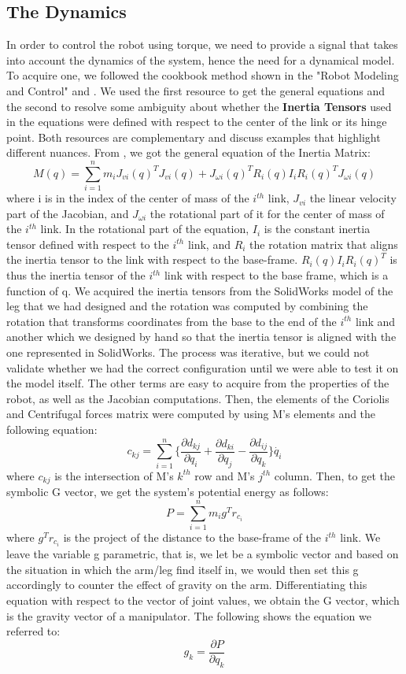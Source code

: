 \subsection{The Dynamics} \label{sec:Dynamics}
In order to control the robot using torque, we need to provide a signal that takes into account the dynamics of the system, hence the need for a dynamical model. To acquire one, we followed the cookbook method shown in the "Robot Modeling and Control" \cite{spong2006robot} and \cite{murray2017mathematical}. We used the first resource to get the general equations and the second to resolve some ambiguity about whether the \textbf{Inertia Tensors} used in the equations were defined with respect to the center of the link or its hinge point. Both resources are complementary and discuss examples that highlight different nuances.
From \cite{spong2006robot}, we got the general equation of the Inertia Matrix:
$$
    M(q) = \sum_{i=1}^n m_i J_{vi}(q)^T J_{vi}(q) +J_{\omega i}(q)^T R_i(q) I_i R_i(q)^T J_{\omega i}(q)
$$
where i is in the index of the center of mass of the $i^{th}$ link, $J_{vi}$ the linear velocity part of the Jacobian, and  $J_{\omega i}$ the rotational part of it for the center of mass of the $i^{th}$ link. In the rotational part of the equation, $I_i$ is the constant inertia tensor defined with respect to the $i^{th}$ link, and $R_i$ the rotation matrix that aligns the inertia tensor to the link with respect to the base-frame. $R_i(q) I_i R_i(q)^T$ is thus the inertia tensor of the $i^{th}$ link with respect to the base frame, which is a function of q.
We acquired the inertia tensors from the SolidWorks model of the leg that we had designed and the rotation was computed by combining the rotation that transforms coordinates from the base to the end of the $i^{th}$ link and another which we designed by hand so that the inertia tensor is aligned with the one represented in SolidWorks. The process was iterative, but we could not validate whether we had the correct configuration until we were able to test it on the model itself.
The other terms are easy to acquire from the properties of the robot, as well as the Jacobian computations.
Then, the elements of the Coriolis and Centrifugal forces matrix were computed by using M's elements and the following equation:
$$
    c_{kj} = \sum_{i=1}^n \{\frac{\partial d_{kj}}{\partial q_i} + \frac{\partial d_{ki}}{\partial q_j} - \frac{\partial d_{ij}}{\partial q_k} \}\dot{q_i}
$$
where $c_{kj}$ is the intersection of M's $k^{th}$ row and M's $j^{th}$ column.
Then, to get the symbolic G vector, we get the system's potential energy as follows:
$$
    P = \sum_{i=1}^n m_i g^T r_{c_i}
$$
where $g^T r_{c_i}$ is the project of the distance to the base-frame of the $i^{th}$ link. We leave the variable g parametric, that is, we let be a symbolic vector and based on the situation in which the arm/leg find itself in, we would then set this g accordingly to counter the effect of gravity on the arm.
Differentiating this equation with respect to the vector of joint values, we obtain the G vector, which is the gravity vector of a manipulator. The following shows the equation we referred to:
$$
    g_k = \frac{\partial P}{\partial q_k}
$$

